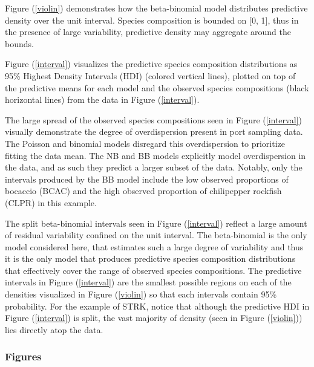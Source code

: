 \documentclass[12pt]{article}
\begin{document}
Figure (\ref{violin}) demonstrates how the beta-binomial model distributes 
predictive density over the unit interval. Species composition is bounded on 
{[}0, 1{]}, thus in the presence of large variability, predictive density may 
aggregate around the bounds.

Figure (\ref{interval}) visualizes the predictive species composition
distributions as 95\% Highest Density Intervals (HDI) (colored vertical
lines), plotted on top of the predictive means for each model and the
observed species compositions (black horizontal lines) from the data in
Figure (\ref{interval}).

The large spread of the observed species compositions seen in
Figure (\ref{interval}) visually demonstrate the degree of overdispersion
present in port sampling data. The Poisson and binomial models disregard
this overdispersion to prioritize fitting the data mean. The NB and BB
models explicitly model overdispersion in the data, and as such they
predict a larger subset of the data. Notably, only the intervals
produced by the BB model include the low observed proportions of
bocaccio (BCAC) and the high observed proportion of chilipepper rockfish
(CLPR) in this example.

The split beta-binomial intervals seen in Figure (\ref{interval}) reflect
a large amount of residual variability confined on the unit interval.
The beta-binomial is the only model considered here, that estimates such
a large degree of variability and thus it is the only model that
produces predictive species composition distributions that effectively
cover the range of observed species compositions. The predictive
intervals in Figure (\ref{interval}) are the smallest possible regions on
each of the densities visualized in Figure (\ref{violin}) so that each
intervals contain 95\% probability. For the example of STRK, notice that
although the predictive HDI in Figure (\ref{interval}) is split, the vast
majority of density (seen in Figure (\ref{violin})) lies directly atop the
data.

%
\clearpage
%

\subsubsection{Figures}
\end{document}
